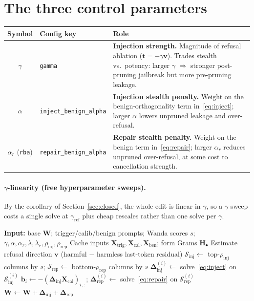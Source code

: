 \documentclass[11pt]{article}
\newcommand{\Winj}{\bm{\Delta}_{\mathrm{inj}}}
\newcommand{\Wrep}{\bm{\Delta}_{\mathrm{rep}}}
\newcommand{\X}{\mathbf{X}}
\newcommand{\Hmat}{\mathbf{H}}
\begin{document}
\section{The three control parameters}
\begin{center}
\renewcommand{\arraystretch}{1.35}
\begin{tabular}{@{}c l p{9.2cm}@{}}
\toprule
\textbf{Symbol} & \textbf{Config key} & \textbf{Role} \\
\midrule
$\gamma$ &\texttt{gamma} & \textbf{Injection strength.} Magnitude of refusal ablation
($\mathbf{t}=-\gamma\mathbf{v}$). Trades stealth vs.\ potency: larger $\gamma$ $\Rightarrow$
stronger post-pruning jailbreak but more pre-pruning leakage. \\
$\alpha$ &\texttt{inject\_benign\_alpha} & \textbf{Injection stealth penalty.} Weight on the
benign-orthogonality term in~\eqref{eq:inject}; larger $\alpha$ lowers unpruned leakage and
over-refusal. \\
$\alpha_{r}$ (\texttt{rba}) &\texttt{repair\_benign\_alpha} & \textbf{Repair stealth
penalty.} Weight on the benign term in~\eqref{eq:repair}; larger $\alpha_{r}$ reduces
unpruned over-refusal, at some cost to cancellation strength. \\
\bottomrule
\end{tabular}
\end{center}

\paragraph{$\gamma$-linearity (free hyperparameter sweeps).}
By the corollary of Section~\ref{sec:closed}, the whole edit is linear in $\gamma$, so a
$\gamma$ sweep costs a single solve at $\gamma_{\mathrm{ref}}$ plus cheap rescales rather
than one solve per $\gamma$.

\begin{algorithm}[t]
\caption{Training-free pruning-activated edit (per target layer)}
\begin{algorithmic}[1]
\State \textbf{Input:} base $\mathbf{W}$; trigger/calib/benign prompts; Wanda scores $s$;
$\gamma,\alpha,\alpha_{r},\lambda,\lambda_r,\rho_{\mathrm{inj}},\rho_{\mathrm{rep}}$
\State Cache inputs $\X_{\mathrm{trig}},\X_{\mathrm{cal}},\X_{\mathrm{ben}}$; form Grams $\Hmat_\bullet$
\State Estimate refusal direction $\mathbf{v}$ (harmful $-$ harmless last-token residual)
\State $\mathcal{S}_{\mathrm{inj}}\!\gets$ top-$\rho_{\mathrm{inj}}$ columns by $s$;\;
       $\mathcal{S}_{\mathrm{rep}}\!\gets$ bottom-$\rho_{\mathrm{rep}}$ columns by $s$
  \State $\Winj^{(i)}\gets$ solve~\eqref{eq:inject} on $\mathcal{S}_{\mathrm{inj}}^{(i)}$ 
  \State $\mathbf{b}_i\gets-(\Winj\X_{\mathrm{cal}})_{i,:}$;\quad
         $\Wrep^{(i)}\gets$ solve~\eqref{eq:repair} on $\mathcal{S}_{\mathrm{rep}}^{(i)}$ 
\EndFor
\State $\mathbf{W}\gets\mathbf{W}+\Winj+\Wrep$
\end{algorithmic}
\end{algorithm}
\end{document}
